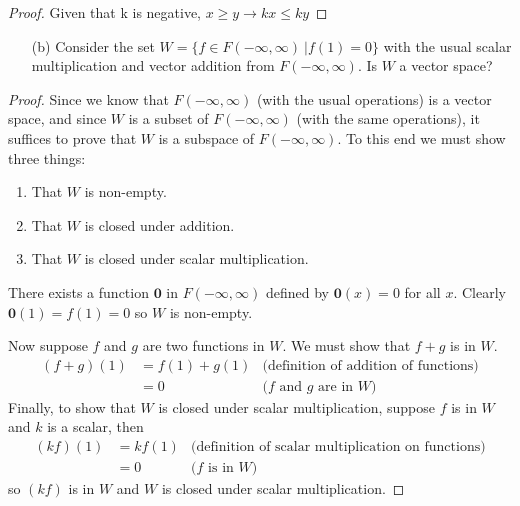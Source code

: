 \documentclass[12pt]{article}
\begin{document}
\begin{enumerate}
\begin{proof}
                      Given that k is negative, ${x\geq y} \rightarrow {kx\leq ky}$
              \end{proof}
              \begin{enumerate}
                      \subsection{Answer: Yes, $W$ is a vector space.}
                      \item[(b)] Consider the set $W = \{f \in F(-\infty, \infty) \ | f(1) = 0\}$
                            with the usual scalar multiplication and vector addition from
                            $F(-\infty, \infty)$.
                            Is $W$ a vector space?
              \end{enumerate}
              \begin{proof}
                      Since we know that $F(-\infty, \infty)$ (with the usual operations) is a vector space,
                      and since $W$ is a subset of $F(-\infty, \infty)$ (with the same operations),
                      it suffices to prove that $W$ is a subspace of $F(-\infty, \infty)$.
                      To this end we must show three things:
                      \begin{enumerate}
                              \item That $W$ is non-empty.
                              \item That $W$ is closed under addition.
                              \item That $W$ is closed under scalar multiplication.
                      \end{enumerate}
                      There exists a function $\mathbf{0}$ in $F(-\infty, \infty)$
                      defined by $\mathbf{0}(x)=0$ for all $x$.
                      Clearly $\mathbf{0}(1)=f(1)=0$ so $W$ is non-empty.

                      Now suppose $f$ and $g$ are two functions in $W$. We must show that $f+g$ is in $W$.
                      \begin{align*}
                              (f+g)(1) & = f(1) + g(1) & \textrm{(definition of addition of functions)} \\
                                       & = 0           & \textrm{($f$ and $g$ are in $W$)}
                      \end{align*}
                      Finally, to show that $W$ is closed under scalar multiplication,
                      suppose $f$ is in $W$ and $k$ is a scalar, then
                      \begin{align*}
                              (kf)(1) & = kf(1) & \textrm{(definition of scalar multiplication on functions)} \\
                                      & = 0     & \textrm{($f$ is in $W$)}
                      \end{align*}
                      so $(kf)$ is in $W$ and $W$ is closed under scalar multiplication.


\end{proof}
\end{enumerate}
\end{document}
